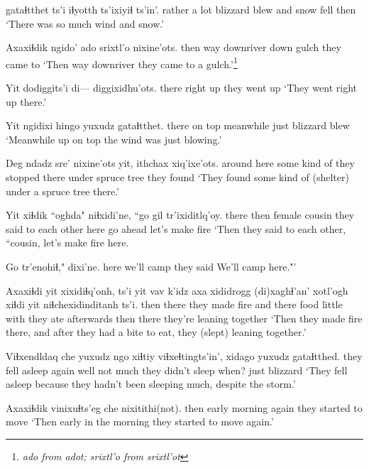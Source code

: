 \documentclass[12pt]{article}
\begin{document}
 gataɬtthet     ts'i iɬyotth   ts'ixiyiɬ ts'in'.
{rather a lot}        {blizzard blew}  and    {snow fell} then
\glt `There was so much wind and snow.'
\glend

\gll Axaxiɬdik ngido' ado srixtl'o nixine'ots.
then      {way downriver} down gulch  {they came to} 
\glt  `Then way downriver they came to a gulch.'\footnote{\em ado \em from \em adot; srixtl'o \em from \em srixtl'ot}
\glend

\gll  Yit   dodiggits'i di--- diggixidhu'ots.
there  {right up}   {}  {they went up}
\glt  `They went right up there.'
\glend

\gll Yit   ngidixi hingo yuxudz gataɬtthet.
there {on top}  meanwhile just  {blizzard blew}
\glt `Meanwhile up on top the wind was just blowing.'
\glend

\gll Deg         {ndadz sre'}   nixine'ots   yit,   ithchax           xiq'ixe'ots.
{around here} {some kind of} {they stopped} there {under spruce tree} {they found}
\glt `They found some kind of (shelter) under a spruce tree there.'
\glend

\gll Yit   xiɬdik ``oghda" niɬxidi'ne,           ``go   gil      tr'ixiditlq'oy.  
there then  {female cousin}  {they said to each other} here {go ahead} {let's make fire} 
\glt `Then they said to each other, ``cousin, let's make fire here.
\glend

\gll  Go   tr'enohiɬ," dixi'ne.
here {we'll camp} {they said}
\glt We'll camp here."'
\glend

\gll Axaxiɬdi yit xixidiɬq'onh,    ts'i  yit vav  k'idz  axa  {xididrogg (di)xaghɬ'an'} xotl'ogh   xiɬdi yit niɬchexidinditanh ts'i. 
then     there {they made fire}   and    there food little with {they ate}             afterwards then  there {{they're leaning together}}
\glt `Then they made fire there, and after they had a bite to eat, they (slept) leaning together.'
\glend

\gll Viɬxendldaq che yuxudz ngo xiɬtiy   {viɬxeɬtingts'in'}, xidago      yuxudz gataɬtthed. 
{they fell asleep} again {}   well {not much} {they didn't sleep} when? just   blizzard
\glt `They fell asleep because they hadn't been sleeping much, despite the storm.'
\glend

\gll Axaxiɬdik vinixuɬts'eg   che   nixitithi(not).         
then      {early morning} again {they started to move }
\glt `Then early in the morning they started to move again.'
\glend
\end{document}

